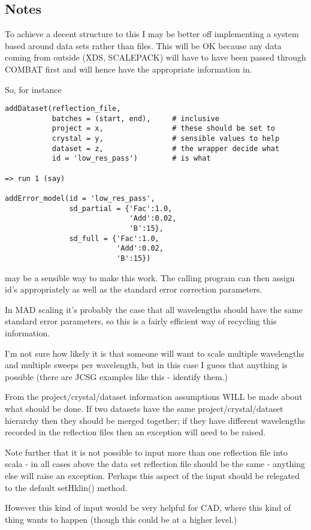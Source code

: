 \documentclass[a4paper, 11pt]{article}
\begin{document}
\subsection{Notes}

To achieve a decent structure to this I may be better off implementing a 
system based around data sets rather than files. This will be OK because 
any data coming from outside (XDS, SCALEPACK) will have to have been passed
through COMBAT first and will hence have the appropriate information in.

So, for instance

{
\tiny
\begin{verbatim}
addDataset(reflection_file,
           batches = (start, end),     # inclusive
           project = x,                # these should be set to
           crystal = y,                # sensible values to help
           dataset = z,                # the wrapper decide what
           id = 'low_res_pass')        # is what

=> run 1 (say)

addError_model(id = 'low_res_pass',
               sd_partial = {'Fac':1.0,
                             'Add':0.02,
                             'B':15},
               sd_full = {'Fac':1.0,
                          'Add':0.02,
                          'B':15})
\end{verbatim}
}
\noindent
may be a sensible way to make this work. The calling program can then assign
id's appropriately as well as the standard error correction parameters.

In MAD scaling it's probably the case that all wavelengths should have the 
same standard error parameters, so this is a fairly efficient way of 
recycling this information.

I'm not sure how likely it is that someone will want to scale multiple
wavelengths and multiple sweeps per wavelength, but in this case I guess
that anything is possible (there are JCSG examples like this - identify 
them.)

From the project/crystal/dataset information assumptions WILL be made about
what should be done. If two datasets have the same project/crystal/dataset
hierarchy then they should be merged together; if they have different 
wavelengths recorded in the reflection files then an exception will need
to be raised.

Note further that it is not possible to input more than one reflection
file into scala - in all cases above the data set reflection file
should be the same - anything else will raise an exception. Perhaps this 
aspect of the input should be relegated to the default setHklin() method.

However this kind of input would be very helpful for CAD, where this kind
of thing wants to happen (though this could be at a higher level.)
\end{document}
